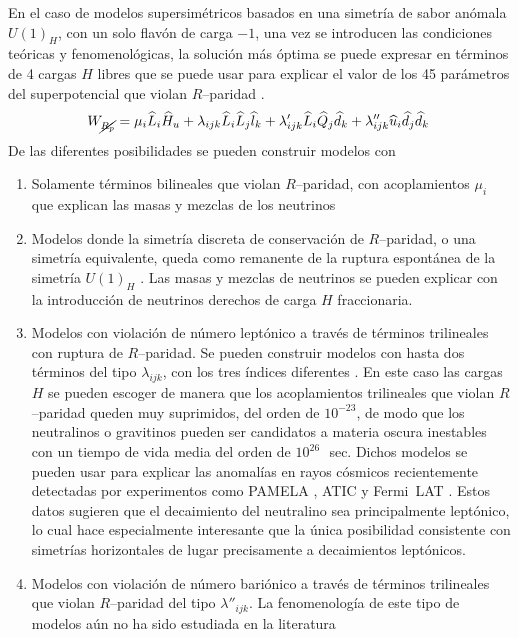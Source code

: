 \begin{ideas}
En el caso de modelos supersimétricos basados en una simetría de sabor anómala $U(1)_H$, con un solo flavón de carga $-1$, una vez se introducen las condiciones teóricas y fenomenológicas, la solución más óptima se puede expresar en términos de 4 cargas $H$ libres que se puede usar para explicar el valor de los 45 parámetros del superpotencial que violan $R$--paridad \cite{Mira:2000gg,Dreiner:2003hw,Dreiner:2003yr,Dreiner:2007vp,Dreiner:2006xw,Sierra:2009zq}. 
\begin{equation}
  \label{eq:5}
  W_{\cancel{R_p}} = \mu_i\widehat{L}_i\widehat{H}_u +
  \lambda_{i j k}\widehat{L}_i\widehat{L}_j\widehat{l}_k +
  \lambda'_{i j k}\widehat{L}_i\widehat{Q}_j\widehat{d}_k +
  \lambda''_{ijk}\widehat{u}_i\widehat{d}_j\widehat{d}_k\,
\end{equation}
De las diferentes posibilidades se pueden construir modelos con
\begin{enumerate}
\item Solamente términos bilineales que violan $R$--paridad, con acoplamientos $\mu_i$ que explican las masas y mezclas de los neutrinos \cite{Mira:2000gg,Dreiner:2003hw,Dreiner:2006xw}
\label{item:1}
\item Modelos donde la simetría discreta de conservación de $R$--paridad, o una simetría equivalente, queda como remanente de la ruptura espontánea de la simetría $U(1)_H$ \cite{Dreiner:2003hw,Dreiner:2003yr,Dreiner:2007vp}. Las masas y mezclas de neutrinos se pueden explicar con la introducción de neutrinos derechos de carga $H$ fraccionaria.
\label{item:2}
\item Modelos con violación de número leptónico a través de términos trilineales con ruptura de $R$--paridad. Se pueden construir modelos con hasta dos términos del tipo $\lambda_{ijk}$, con los tres índices diferentes \cite{Sierra:2009zq}.  En este caso las cargas $H$ se pueden escoger de manera que los acoplamientos trilineales que violan $R$--paridad queden muy suprimidos, del orden de $10^{-23}$, de modo que los neutralinos o gravitinos pueden ser candidatos a materia oscura inestables con un tiempo de vida media del orden de $10^{26}\,$~sec. Dichos modelos se pueden usar para explicar las anomalías en rayos cósmicos \cite{Sierra:2009zq} recientemente detectadas por experimentos como PAMELA \cite{Adriani:2008zr}, ATIC \cite{:2008zzr} y Fermi~LAT \cite{Abdo:2009zk}. Estos datos sugieren que el decaimiento del neutralino sea principalmente leptónico, lo cual hace especialmente interesante que la única posibilidad consistente con simetrías horizontales de lugar precisamente a decaimientos leptónicos.
\label{item:3}
\item Modelos con violación de número bariónico a través de términos trilineales que violan $R$--paridad del tipo $\lambda''_{ijk}$. La fenomenología de este tipo de modelos aún no ha sido estudiada en la literatura
\label{item:4}
\end{enumerate}


\end{ideas}

